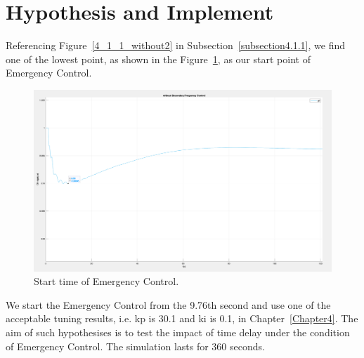 \section{Hypothesis and Implement} %
Referencing Figure~\ref{4_1_1_without2} in Subsection~\ref{subsection4.1.1}, we find one of the lowest point, as shown in the Figure~\ref{6_2_g9}, as our start point of Emergency Control.  

\begin{figure}[htbp]
\centering
\includegraphics[width = .819\textwidth]{figure/6_2_g9.png}
\caption{Start time of Emergency Control.}
\label{6_2_g9}
\end{figure}

We start the Emergency Control from the 9.76th second and use one of the acceptable tuning results, i.e. kp is 30.1 and ki is 0.1, in Chapter~\ref{Chapter4}. The aim of such hypothesises is to test the impact of time delay under the condition of Emergency Control. The simulation lasts for 360 seconds. 